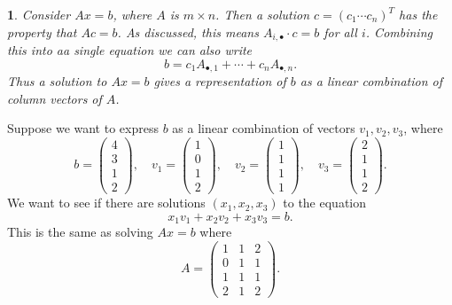 \documentclass[12pt]{article}
\newtheorem{para}[theorem]{}
\begin{document}
\begin{para} 
	Consider $Ax=b$, where $A$ is $m\times n$. Then a solution $c=(c_1\cdots c_n)^T$ has the property that $Ac=b$. As discussed, this means $A_{i,\bullet}\cdot c=b$ for all $i$. Combining this into aa single equation we can also write 
	\begin{equation*}
		b=c_1A_{\bullet, 1}+\cdots +c_nA_{\bullet, n}.
	\end{equation*}
	Thus a solution to $Ax=b$ gives a representation of $b$ as a linear combination of column vectors of $A$.
\end{para}	

\begin{example}
	Suppose we want to express $b$ as a linear combination of vectors $v_1,v_2,v_3$, where 
	\begin{equation*}
		b=\begin{pmatrix}4\\ 3\\ 1\\ 2\end{pmatrix},\quad v_1=\begin{pmatrix}1\\ 0\\ 1\\ 2\end{pmatrix},\quad v_2=\begin{pmatrix}1\\ 1\\ 1\\ 1\end{pmatrix},\quad v_3=\begin{pmatrix}2\\ 1\\ 1\\ 2\end{pmatrix}.
	\end{equation*}
	We want to see if there are solutions $(x_1,x_2,x_3)$ to the equation 
	\begin{equation*}
		x_1v_1+x_2v_2+x_3v_3=b.
	\end{equation*}
	This is the same as solving $Ax=b$ where 
	\begin{equation*}
		A = \begin{pmatrix} 1&1&2 \\ 0&1&1 \\ 1&1&1 \\ 2&1&2 \end{pmatrix}.
	\end{equation*}
\end{example}
\end{document}
